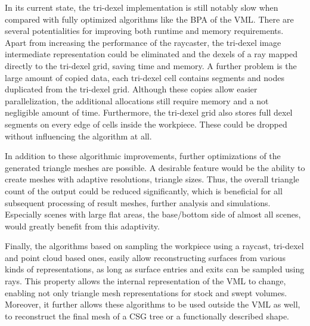 In its current state, the tri-dexel implementation is still notably slow when compared with fully optimized algorithms like the BPA of the VML.
There are several potentialities for improving both runtime and memory requirements.
Apart from increasing the performance of the raycaster, the tri-dexel image intermediate representation could be eliminated and the dexels of a ray mapped directly to the tri-dexel grid, saving time and memory.
A further problem is the large amount of copied data, \eg each tri-dexel cell contains segments and nodes duplicated from the tri-dexel grid.
Although these copies allow easier parallelization, the additional allocations still require memory and a not negligible amount of time.
Furthermore, the tri-dexel grid also stores full dexel segments on every edge of cells inside the workpiece.
These could be dropped without influencing the algorithm at all.

In addition to these algorithmic improvements, further optimizations of the generated triangle meshes are possible.
A desirable feature would be the ability to create meshes with adaptive resolutions, \ie triangle sizes.
Thus, the overall triangle count of the output could be reduced significantly, which is beneficial for all subsequent processing of result meshes, \eg further analysis and simulations.
Especially scenes with large flat areas, \cf the base/bottom side of almost all scenes, would greatly benefit from this adaptivity.

Finally, the algorithms based on sampling the workpiece using a raycast, \ie tri-dexel and point cloud based ones, easily allow reconstructing surfaces from various kinds of representations, as long as surface entries and exits can be sampled using rays.
This property allows the internal representation of the VML to change, enabling not only triangle mesh representations for stock and swept volumes.
Moreover, it further allows these algorithms to be used outside the VML as well, \eg to reconstruct the final mesh of a CSG tree or a functionally described shape.
